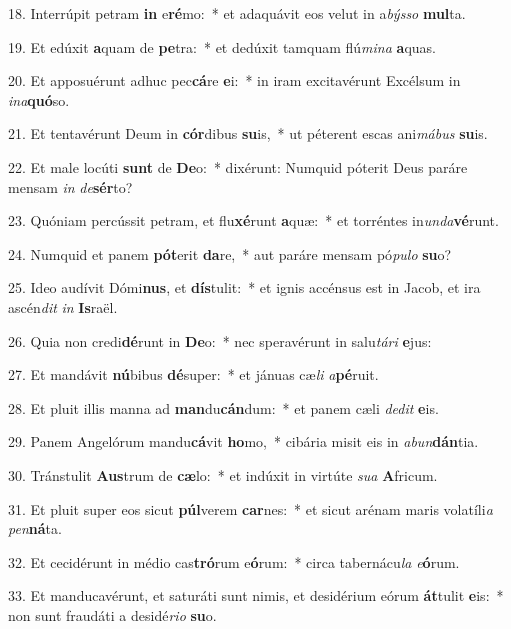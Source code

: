 18. Interrúpit petram \textbf{in} e\textbf{ré}mo:~*  et adaquávit eos velut in a\textit{býs}\textit{so} \textbf{mul}ta.\

19. Et edúxit \textbf{a}quam de \textbf{pe}tra:~*  et dedúxit tamquam flú\textit{mi}\textit{na} \textbf{a}quas.\

20. Et apposuérunt adhuc pec\textbf{cá}re \textbf{e}i:~*  in iram excitavérunt Excélsum in \textit{in}\textit{a}\textbf{quó}so.\

21. Et tentavérunt Deum in \textbf{cór}dibus \textbf{su}is,~*  ut péterent escas ani\textit{má}\textit{bus} \textbf{su}is.\

22. Et male locúti \textbf{sunt} de \textbf{De}o:~*  dixérunt: Numquid póterit Deus paráre mensam \textit{in} \textit{de}\textbf{sér}to?\

23. Quóniam percússit petram, et flu\textbf{xé}runt \textbf{a}quæ:~*  et torréntes in\textit{un}\textit{da}\textbf{vé}runt.\

24. Numquid et panem \textbf{pót}erit \textbf{da}re,~*  aut paráre mensam pó\textit{pu}\textit{lo} \textbf{su}o?\

25. Ideo audívit Dómi\textbf{nus}, et \textbf{dís}tulit:~*  et ignis accénsus est in Jacob, et ira ascén\textit{dit} \textit{in} \textbf{Is}raël.\

26. Quia non credi\textbf{dé}runt in \textbf{De}o:~*  nec speravérunt in salu\textit{tá}\textit{ri} \textbf{e}jus:\

27. Et mandávit \textbf{nú}bibus \textbf{dé}super:~*  et jánuas cæ\textit{li} \textit{a}\textbf{pé}ruit.\

28. Et pluit illis manna ad \textbf{man}du\textbf{cán}dum:~*  et panem cæli \textit{de}\textit{dit} \textbf{e}is.\

29. Panem Angelórum mandu\textbf{cá}vit \textbf{ho}mo,~*  cibária misit eis in \textit{ab}\textit{un}\textbf{dán}tia.\

30. Tránstulit \textbf{Aus}trum de \textbf{cæ}lo:~*  et indúxit in virtúte \textit{su}\textit{a} \textbf{A}fricum.\

31. Et pluit super eos sicut \textbf{púl}verem \textbf{car}nes:~*  et sicut arénam maris volatíli\textit{a} \textit{pen}\textbf{ná}ta.\

32. Et cecidérunt in médio cas\textbf{tró}rum e\textbf{ó}rum:~*  circa tabernácu\textit{la} \textit{e}\textbf{ó}rum.\

33. Et manducavérunt, et saturáti sunt nimis, et desidérium eórum \textbf{át}tulit \textbf{e}is:~*  non sunt fraudáti a desidé\textit{ri}\textit{o} \textbf{su}o.\

